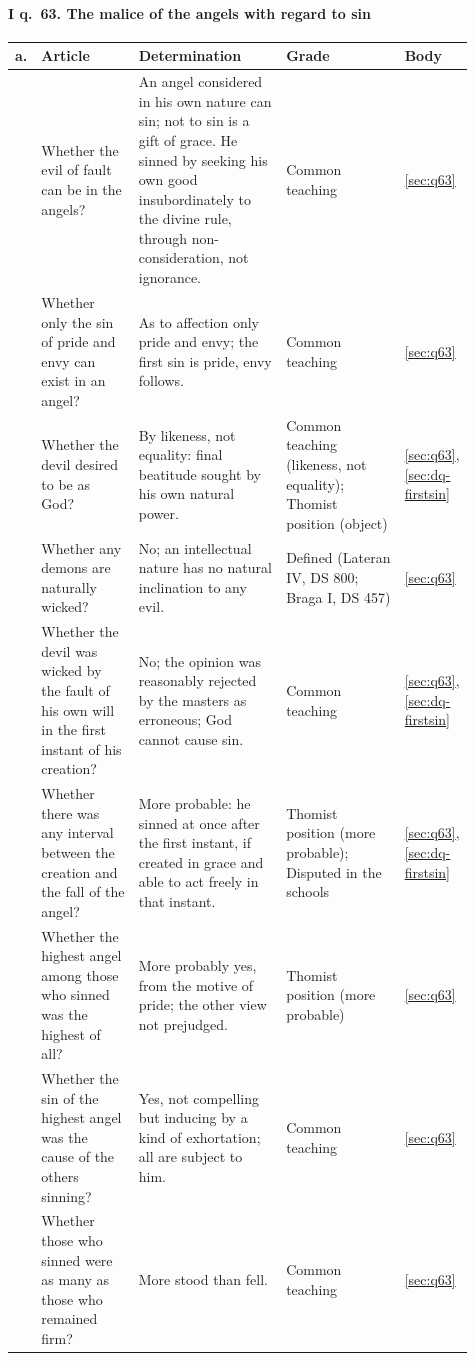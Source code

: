\paragraph{I q.~63. The malice of the angels with regard to sin}

\begingroup\footnotesize
\begin{longtable}{>{\raggedright\arraybackslash}p{0.03\linewidth}>{\raggedright\arraybackslash}p{0.22\linewidth}>{\raggedright\arraybackslash}p{0.33\linewidth}>{\raggedright\arraybackslash}p{0.27\linewidth}>{\raggedright\arraybackslash}p{0.06\linewidth}}
\toprule
\textbf{a.} & \textbf{Article} & \textbf{Determination} & \textbf{Grade} & \textbf{Body}\\
\midrule
\endhead
1 & Whether the evil of fault can be in the angels? & An angel considered in his own nature can sin; not to sin is a gift of grace. He sinned by seeking his own good insubordinately to the divine rule, through non-consideration, not ignorance. & Common teaching & \ref{sec:q63}\\
2 & Whether only the sin of pride and envy can exist in an angel? & As to affection only pride and envy; the first sin is pride, envy follows. & Common teaching & \ref{sec:q63}\\
3 & Whether the devil desired to be as God? & By likeness, not equality: final beatitude sought by his own natural power. & Common teaching (likeness, not equality); Thomist position (object) & \ref{sec:q63}, \ref{sec:dq-firstsin}\\
4 & Whether any demons are naturally wicked? & No; an intellectual nature has no natural inclination to any evil. & Defined (Lateran IV, DS 800; Braga I, DS 457) & \ref{sec:q63}\\
5 & Whether the devil was wicked by the fault of his own will in the first instant of his creation? & No; the opinion was reasonably rejected by the masters as erroneous; God cannot cause sin. & Common teaching & \ref{sec:q63}, \ref{sec:dq-firstsin}\\
6 & Whether there was any interval between the creation and the fall of the angel? & More probable: he sinned at once after the first instant, if created in grace and able to act freely in that instant. & Thomist position (more probable); Disputed in the schools & \ref{sec:q63}, \ref{sec:dq-firstsin}\\
7 & Whether the highest angel among those who sinned was the highest of all? & More probably yes, from the motive of pride; the other view not prejudged. & Thomist position (more probable) & \ref{sec:q63}\\
8 & Whether the sin of the highest angel was the cause of the others sinning? & Yes, not compelling but inducing by a kind of exhortation; all are subject to him. & Common teaching & \ref{sec:q63}\\
9 & Whether those who sinned were as many as those who remained firm? & More stood than fell. & Common teaching & \ref{sec:q63}\\
\bottomrule
\end{longtable}
\endgroup

